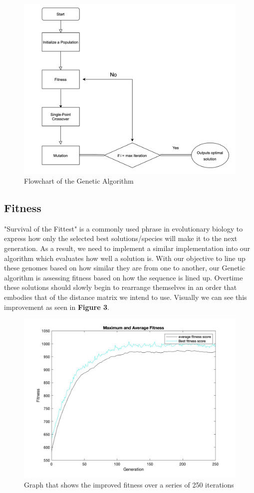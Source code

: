 \begin{figure}[h]
\centering
\includegraphics[width=.5\textwidth]{figures/flowchart_GA}
\caption{Flowchart of the Genetic Algorithm}
\end{figure}
  
\subsection{Fitness}

"Survival of the Fittest" is a commonly used phrase in evolutionary biology to express how only the selected best solutions/species will make it to the next generation. 
As a result, we need to implement a similar implementation into our algorithm which evaluates how well a solution is. 
With our objective to line up these genomes based on how similar they are from one to another, our Genetic algorithm is assessing fitness based on how the sequence is lined up. 
Overtime these solutions should slowly begin to rearrange themselves in an order that embodies that of the distance matrix we intend to use. 
Visually we can see this improvement as seen in \textbf{Figure 3}. 

\begin{figure}[h]
\centering
\includegraphics[width=.75\textwidth]{figures/Fitness.jpg}
\caption{Graph that shows the improved fitness over a series of 250 iterations}
\end{figure}

